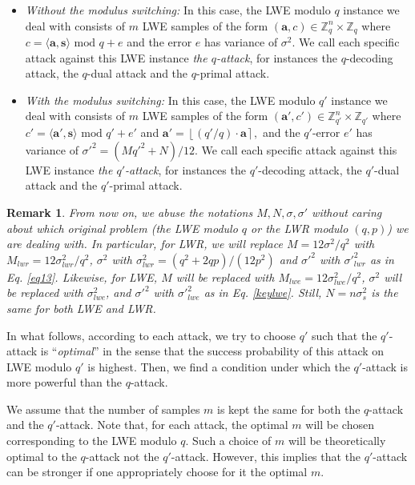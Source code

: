 \documentclass{cta-author}
\newtheorem{remark}{Remark}{}
\begin{document}
\begin{itemize}
	\item \textit{Without the modulus switching:} In this case, the LWE modulo $q$  instance we deal with consists of $m$ LWE samples of the form $(\mathbf{a},c) \in \mathbb{Z}_q^{n} \times \mathbb{Z}_q$ where
	$c =\langle \mathbf{a}, \mathbf{s} \rangle \text{ mod } q+e$
	and the error $e$ has variance of $ \sigma^2$. We call each specific attack against this LWE instance \textit{the $q$-attack}, for instances the $q$-decoding attack, the $q$-dual attack and the $q$-primal attack.
	
	\item \textit{With the modulus switching:}  In this case, the LWE modulo $q'$ instance we deal with consists of $m$ LWE samples of the form $(\mathbf{a}',c') \in \mathbb{Z}_{q'}^{n} \times \mathbb{Z}_{q'}$
	where $c'=\langle \mathbf{a}',\mathbf{s} \rangle \text{ mod } q'+e'$ and $\mathbf{a}'=\left\lfloor ({q'}/{q}) \cdot \mathbf{a} \right\rceil,$ and the $q'$-error $e'$ has variance of  
	$\sigma'^2 =\left(Mq'^2+N \right)/12
	$.
	We call each specific attack against this LWE instance \textit{the $q'$-attack}, for instances the $q'$-decoding attack, the $q'$-dual attack and the $q'$-primal attack.
\end{itemize} 
\begin{remark}  \label{rem2}
From now on, we abuse the notations $M, N, \sigma, \sigma'$ without caring about which original problem (the LWE modulo $q$ or the LWR modulo $(q,p)$) we are dealing with. In particular, for LWR, we will replace $M=12\sigma^2/q^2$ with $M_{lwr}= 12 \sigma_{lwr}^2/q^2$, $\sigma^2$ with $\sigma_{lwr}^2= (q^2+2qp)/(12p^2)$ and ${\sigma'}^2$ with ${\sigma'}_{lwr}^2$ as in Eq. \eqref{eq13}. Likewise, for LWE, $M$ will be replaced with $M_{lwe}=12 \sigma_{lwe}^2/q^2$, $\sigma^2$ will be replaced with $\sigma_{lwe}^2$, and $\sigma'^2$ with ${\sigma'}_{lwe}^2$ as in Eq. \eqref{keylwe}. Still, $N=n\sigma_s^2$  is the same for both LWE and LWR.

\end{remark} 

In what follows, according to each attack, we try to choose $q'$ such that the $q'$-attack is ``\textit{optimal}'' in the sense that the success probability of this attack on LWE modulo $q'$ is highest. Then, we find a condition under which the $q'$-attack is more powerful than the $q$-attack.

We assume that the number of samples $m$ is kept the same for both the $q$-attack and the $q'$-attack.  Note that, for each attack, the optimal $m$ will be chosen corresponding to the LWE modulo $q$. Such a choice of $m$ will be theoretically optimal to the $q$-attack not the $q'$-attack. However, this implies that the $q'$-attack can be stronger if one appropriately choose for it the optimal $m$. 
\end{document}
